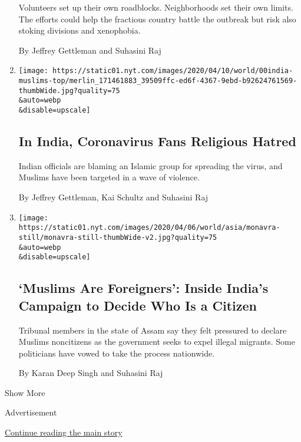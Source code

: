 \begin{enumerate}
  Volunteers set up their own roadblocks. Neighborhoods set their own
  limits. The efforts could help the fractious country battle the
  outbreak but risk also stoking divisions and xenophobia.

  By Jeffrey Gettleman and Suhasini Raj
\item
  \href{/2020/04/12/world/asia/india-coronavirus-muslims-bigotry.html}{}

  \texttt{[image: https://static01.nyt.com/images/2020/04/10/world/00india-muslims-top/merlin\_171461883\_39509ffc-ed6f-4367-9ebd-b92624761569-thumbWide.jpg?quality=75\\\&auto=webp\\\&disable=upscale]}

  \hypertarget{in-india-coronavirus-fans-religious-hatred}{%
  \subsection{In India, Coronavirus Fans Religious
  Hatred}\label{in-india-coronavirus-fans-religious-hatred}}

  Indian officials are blaming an Islamic group for spreading the virus,
  and Muslims have been targeted in a wave of violence.

  By Jeffrey Gettleman, Kai Schultz and Suhasini Raj
\item
  \href{/2020/04/04/world/asia/india-modi-citizenship-muslims-assam.html}{}

  \texttt{[image: https://static01.nyt.com/images/2020/04/06/world/asia/monavra-still/monavra-still-thumbWide-v2.jpg?quality=75\\\&auto=webp\\\&disable=upscale]}

  \hypertarget{muslims-are-foreigners-inside-indias-campaign-to-decide-who-is-a-citizen}{%
  \subsection{`Muslims Are Foreigners': Inside India's Campaign to
  Decide Who Is a
  Citizen}\label{muslims-are-foreigners-inside-indias-campaign-to-decide-who-is-a-citizen}}

  Tribunal members in the state of Assam say they felt pressured to
  declare Muslims noncitizens as the government seeks to expel illegal
  migrants. Some politicians have vowed to take the process nationwide.

  By Karan Deep Singh and Suhasini Raj
\end{enumerate}

Show More

Advertisement

\protect\hyperlink{after-mid2}{Continue reading the main story}

